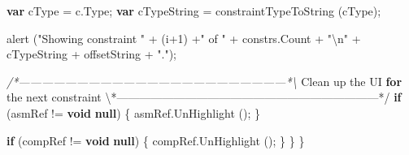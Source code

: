 \documentclass[]{article}
\newenvironment{Shaded}{}{}
\newcommand{\KeywordTok}[1]{\textcolor[rgb]{0.00,0.44,0.13}{\textbf{{#1}}}}
\newcommand{\DecValTok}[1]{\textcolor[rgb]{0.25,0.63,0.44}{{#1}}}
\newcommand{\CharTok}[1]{\textcolor[rgb]{0.25,0.44,0.63}{{#1}}}
\newcommand{\StringTok}[1]{\textcolor[rgb]{0.25,0.44,0.63}{{#1}}}
\newcommand{\CommentTok}[1]{\textcolor[rgb]{0.38,0.63,0.69}{\textit{{#1}}}}
\newcommand{\OtherTok}[1]{\textcolor[rgb]{0.00,0.44,0.13}{{#1}}}
\newcommand{\FunctionTok}[1]{\textcolor[rgb]{0.02,0.16,0.49}{{#1}}}
\newcommand{\NormalTok}[1]{{#1}}
\begin{document}
\begin{Shaded}
\begin{Highlighting}[]
      \KeywordTok{var} \NormalTok{cType  = }\OtherTok{c}\NormalTok{.}\FunctionTok{Type}\NormalTok{;}
      \KeywordTok{var} \NormalTok{cTypeString = }\FunctionTok{constraintTypeToString} \NormalTok{(cType);}
      
      \FunctionTok{alert}  \NormalTok{(}\StringTok{"Showing constraint "} \NormalTok{+ (i}\DecValTok{+1}\NormalTok{) +}\StringTok{" of "} \NormalTok{+ }\OtherTok{constrs}\NormalTok{.}\FunctionTok{Count} \NormalTok{+ }\StringTok{"}\CharTok{\textbackslash{}n}\StringTok{"} \NormalTok{+ }
          \NormalTok{cTypeString + offsetString + }\StringTok{"."}\NormalTok{);}
    
\CommentTok{/*---------------------------------------------------------------------*\textbackslash{}}
  \NormalTok{Clean up the UI }\KeywordTok{for} \NormalTok{the next constraint}
\NormalTok{\textbackslash{}*---------------------------------------------------------------------*}\OtherTok{/}
      \KeywordTok{if} \NormalTok{(asmRef != }\KeywordTok{void} \KeywordTok{null}\NormalTok{)}
    \NormalTok{\{}
      \OtherTok{asmRef}\NormalTok{.}\FunctionTok{UnHighlight} \NormalTok{();}
    \NormalTok{\}}
      
      \KeywordTok{if} \NormalTok{(compRef != }\KeywordTok{void} \KeywordTok{null}\NormalTok{)}
    \NormalTok{\{}
      \OtherTok{compRef}\NormalTok{.}\FunctionTok{UnHighlight} \NormalTok{();}
    \NormalTok{\}}
    \NormalTok{\}}
\NormalTok{\}}
    

\end{Highlighting}
\end{Shaded}
\end{document}
